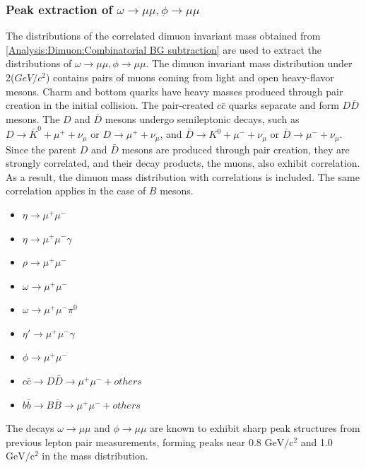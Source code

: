             \subsubsection{Peak extraction of $\omega \rightarrow \mu\mu ,\phi \rightarrow \mu\mu$}
            \label{Peak_extraction}
                The distributions of the correlated dimuon invariant mass obtained from \ref{Analysis:Dimuon:Combinatorial BG subtraction} are used to extract the distributions of $\omega \rightarrow \mu\mu,\phi \rightarrow \mu\mu$. The dimuon invariant mass distribution under 2($GeV/c^2$) contains pairs of muons coming from light and open heavy-flavor mesons. Charm and bottom quarks have heavy masses produced through pair creation in the initial collision. The pair-created \(c\bar{c}\) quarks separate and form \(D\bar{D}\) mesons. The \(D\) and \(\bar{D}\) mesons undergo semileptonic decays, such as \(D \rightarrow \bar{K}^0 + \mu^+ + \nu_\mu\) or \(D \rightarrow \mu^+ + \nu_\mu\), and \(\bar{D} \rightarrow K^0 + \mu^- + \nu_\mu\) or \(\bar{D} \rightarrow \mu^- + \nu_\mu\). Since the parent \(D\) and \(\bar{D}\) mesons are produced through pair creation, they are strongly correlated, and their decay products, the muons, also exhibit correlation. As a result, the dimuon mass distribution with correlations is included. The same correlation applies in the case of \(B\) mesons.
                \begin{itemize}
                    \item $\eta \rightarrow \mu^+ \mu^-$
                    \item $\eta \rightarrow \mu^+ \mu^- \gamma$
                    \item $\rho \rightarrow \mu^+ \mu^-$
                    \item $\omega \rightarrow \mu^+ \mu^-$
                    \item $\omega \rightarrow \mu^+ \mu^- \pi^0$
                    \item $\eta' \rightarrow \mu^+ \mu^- \gamma$
                    \item $\phi \rightarrow \mu^+ \mu^-$
                    \item $c\bar{c} \rightarrow D\bar{D} \rightarrow \mu^+ \mu^- + others$
                    \item $b\bar{b} \rightarrow B\bar{B} \rightarrow \mu^+ \mu^- + others$
                \end{itemize}
                The decays \(\omega \rightarrow \mu\mu\) and \(\phi \rightarrow \mu\mu\) are known to exhibit sharp peak structures from previous lepton pair measurements, forming peaks near 0.8 \(\mathrm{GeV/c^2}\) and 1.0 \(\mathrm{GeV/c^2}\) in the mass distribution.
